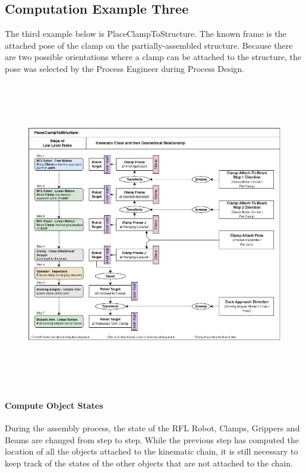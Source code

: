\documentclass[11pt]{book}
\begin{document}
\subsection{Computation Example Three}

The third example below is PlaceClampToStructure. The known frame is the attached pose of the clamp on the partially-assembled structure. Because there are two possible orientations where a clamp can be attached to the structure, the pose was selected by the Process Engineer during Process Design.

\begin{figure}[H]
\includegraphics[width=15.92cm,height=13.44cm]{./images/image35.jpeg}
\end{figure}


\paragraph{Compute Object States}

During the assembly process, the state of the RFL Robot, Clamps, Grippers and Beams are changed from step to step. While the previous step has computed the location of all the objects attached to the kinematic chain, it is still necessary to keep track of the states of the other objects that are not attached to the chain.
\end{document}
